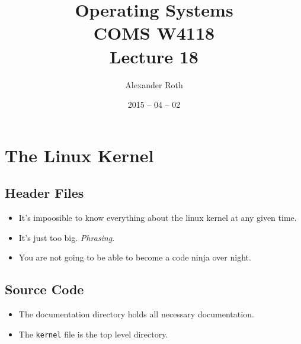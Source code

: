 \documentclass[]{article}
\begin{document}
\newcommand{\code}{\texttt}
\newtheorem{thm}{Theorem}
\title{Operating Systems \\ COMS W4118 \\ Lecture 18}
\author{Alexander Roth}
\date{2015 -- 04 -- 02}
\maketitle

\section{The Linux Kernel}
\subsection{Header Files}
\begin{itemize}
\item It's impoosible to know everything about the linux kernel at any given
time.
\item It's just too big. \emph{Phrasing}.
\item You are not going to be able to become a code ninja over night.
\end{itemize}

\subsection{Source Code}
\begin{itemize}
\item The documentation directory holds all necessary documentation.
\item The \code{kernel} file is the top level directory.
\end{itemize}
\end{document}
